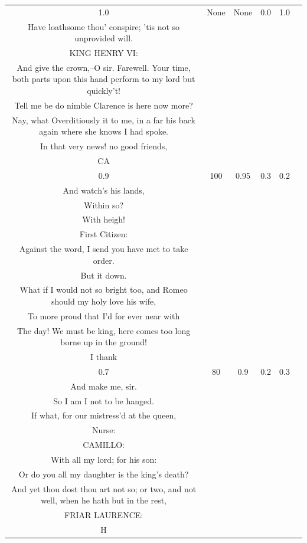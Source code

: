 \documentclass[11pt]{book}
\begin{document}
\begin{longtable}{ccccc >{\raggedright\arraybackslash}p{8cm}}
    1.0 & None & None & 0.0 & 1.0 &
    \begin{tcolorbox}[breakable, enhanced jigsaw, frame hidden, colback=white, boxrule=0pt]
    KING RICHARD:\\
    Have loathsome thou' conspire; 'tis not so unprovided will.\\
    KING HENRY VI:\\
    And give the crown,--O sir. Farewell. Your time, both parts upon this hand perform to my lord but quickly't!\\
    Tell me be do nimble Clarence is here now more?\\
    Nay, what Overditiously it to me, in a far his back again where she knows I had spoke.\\
    In that very news! no good friends,\\
    CA
    \end{tcolorbox} \\
    
    0.9 & 100 & 0.95 & 0.3 & 0.2 &
    \begin{tcolorbox}[breakable, enhanced jigsaw, frame hidden, colback=white, boxrule=0pt]
    KING RICHARD: \\
    And watch's his lands,\\
    Within so?\\
    With heigh!\\
    First Citizen:\\
    Against the word, I send you have met to take order.\\
    But it down.\\
    What if I would not so bright too, and Romeo should my holy love his wife,\\
    To more proud that I'd for ever near with\\
    The day! We must be king, here comes too long borne up in the ground!\\
    I thank
    \end{tcolorbox} \\
    

    0.7 & 80 & 0.9 & 0.2 & 0.3 &
    \begin{tcolorbox}[breakable, enhanced jigsaw, frame hidden, colback=white, boxrule=0pt]
    KING RICHARD: \\
    And make me, sir. \\
    So I am I not to be hanged. \\
    If what, for our mistress'd at the queen, \\
    Nurse: \\
    CAMILLO: \\
    With all my lord; for his son: \\
    Or do you all my daughter is the king's death? \\
    And yet thou dost thou art not so; or two, and not well, when he hath but in the rest, \\
    FRIAR LAURENCE: \\
    H
    \end{tcolorbox} \\
    
    
    \end{longtable}
\end{document}
